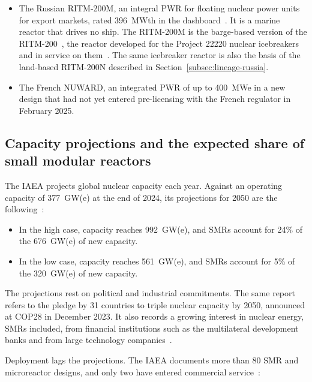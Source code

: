 \begin{itemize}
  \item The Russian RITM-200M, an integral PWR for floating nuclear
        power units for export markets, rated 396~MWth in the
        dashboard~\cite{nea_dashboard_2025}. It is a marine reactor that
        drives no ship. The RITM-200M is the barge-based version of the
        RITM-200~\cite{wna_ships}, the reactor developed for the Project
        22220 nuclear icebreakers and in service on
        them~\cite{ritm200n_nei_2024}. The same icebreaker reactor is also
        the basis of the land-based RITM-200N described in
        Section~\ref{subsec:lineage-russia}.

  \item The French NUWARD, an integrated PWR of up to 400~MWe in a new
        design that had not yet entered pre-licensing with the French
        regulator in February 2025.
\end{itemize}

\subsection{Capacity projections and the expected share of small modular reactors}
\label{subsec:why-now}

The IAEA projects global nuclear capacity each year. Against an
operating capacity of 377~GW(e) at the end of 2024, its projections for
2050 are the following~\cite{iaea_rds1_2025}:

\begin{itemize}
  \item In the high case, capacity reaches 992~GW(e), and SMRs account
        for 24\% of the 676~GW(e) of new capacity.

  \item In the low case, capacity reaches 561~GW(e), and SMRs account
        for 5\% of the 320~GW(e) of new capacity.
\end{itemize}

The projections rest on political and industrial commitments. The same
report refers to the pledge by 31 countries to triple nuclear capacity
by 2050, announced at COP28 in December 2023. It also records a growing
interest in nuclear energy, SMRs included, from financial institutions
such as the multilateral development banks and from large technology
companies~\cite{iaea_rds1_2025}.

Deployment lags the projections. The IAEA documents more than 80 SMR
and microreactor designs, and only two have entered commercial
service~\cite{worldnuclearreport_smr}:


